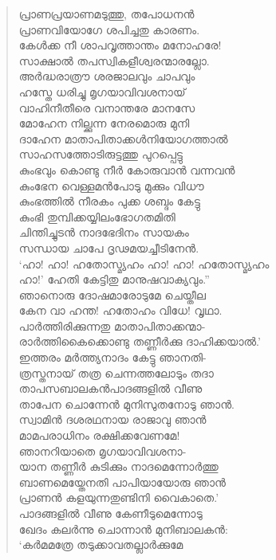 \begin{verse}
പ്രാണപ്രയാണമടുത്തു, തപോധനന്‍\\
പ്രാണവിയോഗേ ശപിച്ചതു കാരണം.\\
കേള്‍ക്ക നീ ശാപവൃത്താന്തം മനോഹരേ!\\
സാക്ഷാല്‍ തപസ്വികളീശ്വരന്മാരല്ലോ.\\
അര്‍ദ്ധരാത്രൗ ശരജാലവും ചാപവും\\
ഹസ്തേ ധരിച്ചു മൃഗയാവിവശനായ്\\
വാഹിനീതീരെ വനാന്തരേ മാനസേ\\
മോഹേന നില്ക്കുന്ന നേരമൊരു മുനി\\
ദാഹേന മാതാപിതാക്കള്‍നിയോഗത്താല്‍\\
സാഹസത്തോടിരുട്ടത്തു പുറപ്പെട്ടു\\
കുംഭവും കൊണ്ടു നീര്‍ കോരുവാന്‍ വന്നവന്‍\\
കുംഭേന വെള്ളമന്‍പോടു മുക്കും വിധൗ\\
കുംഭത്തില്‍ നീരകം പുക്ക ശബ്ദം കേട്ടു\\
കുംഭി തുമ്പിക്കയ്യിലംഭോഗതമിതി\\
ചിന്തിച്ചുടന്‍ നാദഭേദിനം സായകം\\
സന്ധായ ചാപേ ദൃഢമയച്ചീടിനേന്‍.\\
‘ഹാ! ഹാ! ഹതോസ്മ്യഹം ഹാ! ഹാ! ഹതോസ്മ്യഹം\\
ഹാ!’ ഹേതി കേട്ടിതു മാനുഷവാക്യവും.”\\
ഞാനൊരു ദോഷമാരോടുമേ ചെയ്തീല\\
കേന വാ ഹന്ത! ഹതോഹം വിധേ! വൃഥാ.\\
പാര്‍ത്തിരിക്കുന്നതു മാതാപിതാക്കന്മാ-\\
രാര്‍ത്തികൈക്കൊണ്ടു തണ്ണീര്‍ക്കു ദാഹിക്കയാല്‍.’\\
ഇത്തരം മര്‍ത്ത്യനാദം കേട്ടു ഞാനതി-\\
ത്രസ്തനായ് തത്ര ചെന്നത്തലോടും തദാ\\
താപസബാലകന്‍പാദങ്ങളില്‍ വീണു\\
താപേന ചൊന്നേന്‍ മുനിസുതനോടു ഞാന്‍.\\
സ്വാമിന്‍ ദശരഥനായ രാജാവു ഞാന്‍\\
മാമപരാധിനം രക്ഷിക്കവേണമേ!\\
ഞാനറിയാതെ മൃഗയാവിവശനാ-\\
യാന തണ്ണീര്‍ കുടിക്കും നാദമെന്നോര്‍ത്തു\\
ബാണമെയ്തേനതി പാപിയായോരു ഞാന്‍\\
പ്രാണന്‍ കളയുന്നതുണ്ടിനി വൈകാതെ.’\\
പാദങ്ങളില്‍ വീണു കേണീടുമെന്നോടു\\
ഖേദം കലര്‍ന്നു ചൊന്നാന്‍ മുനിബാലകന്‍:\\
‘കര്‍മമത്രേ തടുക്കാവതല്ലാര്‍ക്കുമേ\\

\end{verse}
